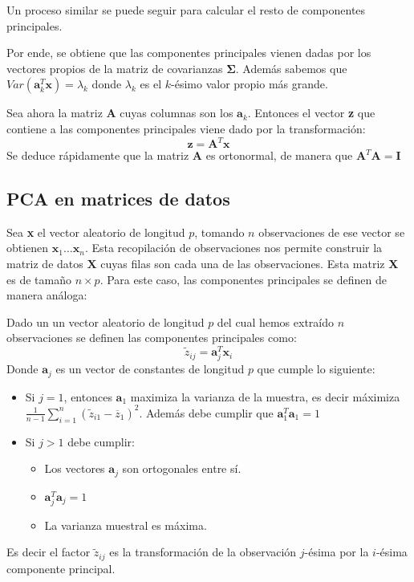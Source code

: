 \noindent Un proceso similar se puede seguir para calcular el resto de componentes principales. 

\noindent Por ende, se obtiene que las componentes principales vienen dadas por los vectores propios de la matriz de covarianzas $\mathbf{\Sigma} $. Además sabemos que $Var(\textbf{a}_k^T \textbf{x})=\lambda_k$ donde $\lambda_k$ es el $k$-ésimo valor propio más grande. 

\noindent Sea ahora la matriz $\textbf{A}$ cuyas columnas son los $\textbf{a}_k$. Entonces el vector \textbf{z} que contiene a las componentes principales viene dado por la transformación:
\begin{equation}
\textbf{z}=\textbf{A}^T\textbf{x}
\end{equation}
\noindent Se deduce rápidamente que la matriz $\textbf{A}$ es ortonormal, de manera que $\textbf{A}^T\textbf{A}=\textbf{I}$

\subsection{PCA en matrices de datos}

\noindent Sea \textbf{x} el vector aleatorio de longitud $p$, tomando $n$ observaciones de ese vector se obtienen $\textbf{x}_1\ldots \textbf{x}_n$.
Esta recopilación de observaciones nos permite construir la matriz de datos $\textbf{X}$ cuyas filas son cada una de las observaciones. Esta matriz \textbf{X} es de tamaño $n\times p$. 
Para este caso, las componentes principales se definen de manera análoga:
\begin{defi}
Dado un un vector aleatorio de longitud $p$ del cual hemos extraído $n$ observaciones se definen las componentes principales como:
\begin{equation}
\widetilde{z}_{ij}=\textbf{a}^T_j\textbf{x}_i
\end{equation}
Donde $\textbf{a}_j$ es un vector de constantes de longitud $p$ que cumple lo siguiente:
\begin{itemize}
\item Si $j=1$, entonces $\textbf{a}_1$ maximiza la varianza de la muestra, es decir máximiza $\frac{1}{n-1}\sum_{i=1}^{n}(\widetilde{z}_{i1}-\overline{z}_1)^2$. Además debe cumplir que $\textbf{a}_1^T\textbf{a}_1=1$
\item Si $j>1$ debe cumplir:
\begin{itemize}
\item Los vectores $\textbf{a}_j$ son ortogonales entre sí. 
\item $\textbf{a}_j^T \textbf{a}_j=1$
\item La varianza muestral es máxima. 
\end{itemize}
\end{itemize}
Es decir el factor $\widetilde{z}_{ij}$ es la transformación de la observación $j$-ésima por la $i$-ésima componente principal. 
 
\end{defi}


